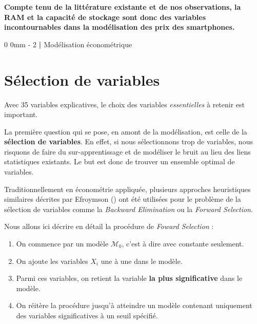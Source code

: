 \documentclass[
  12pt,
]{report}
\makeatletter
\providecommand{\tightlist}{%
  \setlength{\itemsep}{0pt}\setlength{\parskip}{0pt}}\usepackage{longtable,booktabs,array}
\renewcommand{\chapter}{%
    \clearpage %
    \@startsection{chapter}%
    {0} %
    {0mm} %
    {-\baselineskip} %
    {2\baselineskip} %
    {\normalfont\Huge\bfseries | \Huge\bfseries}%
}
\makeatother
\begin{document}
\textbf{Compte tenu de la littérature existante et de nos observations,
la RAM et la capacité de stockage sont donc des variables
incontournables dans la modélisation des prix des smartphones.}

\chapter{Modélisation
économétrique}\label{moduxe9lisation-uxe9conomuxe9trique}

\section{Sélection de variables}\label{suxe9lection-de-variables}

Avec 35 variables explicatives, le choix des variables
\emph{essentielles} à retenir est important.

La première question qui se pose, en amont de la modélisation, est celle
de la \textbf{sélection de variables}. En effet, si nous sélectionnons
trop de variables, nous risquons de faire du sur-apprentissage et de
modéliser le bruit au lieu des liens statistiques existants. Le but est
donc de trouver un ensemble optimal de variables.

Traditionnellement en économétrie appliquée, plusieurs approches
heuristiques similaires décrites par Efroymson
() ont été utilisées pour le problème
de la sélection de variables comme la \emph{Backward Elimination} ou la
\emph{Forward Selection}.

Nous allons ici décrire en détail la procédure de \emph{Foward
Selection} :

\begin{enumerate}
\def\labelenumi{\arabic{enumi}.}
\tightlist
\item
  On commence par un modèle \(\mathcal{M}_0\), c'est à dire avec
  constante seulement.
\item
  On ajoute les variables \(X_i\) une à une dans le modèle.
\item
  Parmi ces variables, on retient la variable \textbf{la plus
  significative} dans le modèle.
\item
  On réitère la procédure jusqu'à atteindre un modèle contenant
  uniquement des variables significatives à un seuil spécifié.
\end{enumerate}
\end{document}
